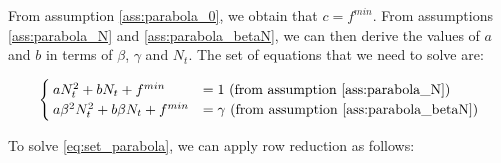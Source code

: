\documentclass[12pt]{article}
\begin{document}
\begin{appendices}
		From assumption \ref{ass:parabola_0}, we obtain that $c = f^{min}$. From assumptions \ref{ass:parabola_N} and \ref{ass:parabola_betaN}, we can then derive the values of $a$ and $b$ in terms of $\beta$, $\gamma$ and $N_t$. The set of equations that we need to solve are:
		
		\begin{equation} \label{eq:set_parabola}
		    \begin{cases}
		        aN_t^2 + bN_t + f^{min} &= 1 \text{ (from assumption \ref{ass:parabola_N})}\\
		        a\beta^2 N_t^2 + b\beta N_t + f^{min} &= \gamma \text{ (from assumption \ref{ass:parabola_betaN})}
		    \end{cases}
		\end{equation}
		
		To solve \eqref{eq:set_parabola}, we can apply row reduction as follows:
		

\end{appendices}
\end{document}
